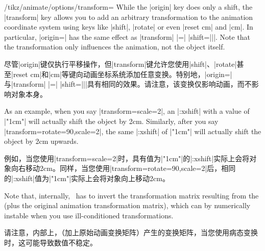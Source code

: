 \begin{key}{/tikz/animate/options/transform=}
    While the |origin| key does only a shift, the |transform| key allows you to
    add an arbitrary transformation to the animation coordinate system using
    keys like |shift|, |rotate| or even |reset cm| and |cm|. In particular,
    |origin=| has the same effect as |transform| |=|
    |{shift=||}|. Note that the transformation only influences the
    animation, not the object itself.

    尽管|origin|键仅执行平移操作，但|transform|键允许您使用|shift|、|rotate|甚至|reset cm|和|cm|等键向动画坐标系统添加任意变换。特别地，|origin=|与|transform| |=| |{shift=||}|具有相同的效果。请注意，该变换仅影响动画，而不影响对象本身。

    As an example, when you say |transform={scale=2}|, an |:xshift| with a
    value of |"1cm"| will actually shift the object by 2cm. Similarly, after
    you say |transform={rotate=90,scale=2}|, the same |:xshift| of |"1cm"| will
    actually shift the object by 2cm upwards.

    例如，当您使用|transform={scale=2}|时，具有值为|"1cm"|的|:xshift|实际上会将对象向右移动2cm。同样，当您使用|transform={rotate=90,scale=2}|后，相同的|:xshift|值为|"1cm"|实际上会将对象向上移动2cm。

    Note that, internally, \tikzname\ has to invert the transformation matrix
    resulting from the  (plus the original animation
    transformation matrix), which can by numerically instable when you use
    ill-conditioned transformations.
    
    请注意，内部上，\tikzname{}（加上原始动画变换矩阵）产生的变换矩阵，当您使用病态变换时，这可能导致数值不稳定。


\begin{codeexample}[
    preamble={\usetikzlibrary{animations}},
    animation list={0.5,1,1.5,2},
]
\end{codeexample}
\begin{codeexample}[
    preamble={\usetikzlibrary{animations}},
    animation list={0.5,1,1.5,2},
]
\end{codeexample}
\end{key}


